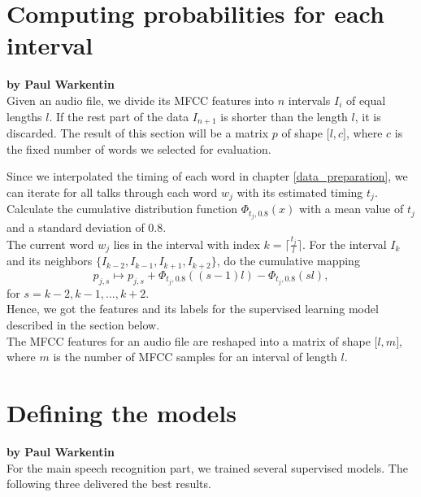 \section{Computing probabilities for each interval}
\label{interval_word_prob}

\textbf{by Paul Warkentin} \\

Given an audio file, we divide its MFCC features into $n$ intervals $I_i$ of equal lengths $l$. If the rest part of the data $I_{n+1}$ is shorter than the length $l$, it is discarded. The result of this section will be a matrix $p$ of shape $\lbrack l, c \rbrack$, where $c$ is the fixed number of words we selected for evaluation.

Since we interpolated the timing of each word in chapter \ref{data_preparation}, we can iterate for all talks through each word $w_j$ with its estimated timing $t_j$. Calculate the cumulative distribution function $\Phi_{t_j, 0.8}(x)$ with a mean value of $t_j$ and a standard deviation of 0.8. \\
The current word $w_j$ lies in the interval with index $k = \lceil \tfrac{t_j}{l} \rceil$. For the interval $I_k$ and its neighbors $\{I_{k-2}, I_{k-1}, I_{k+1}, I_{k+2}\}$, do the cumulative mapping
\[p_{j, s} \mapsto p_{j, s} + \Phi_{t_j, 0.8}((s - 1) l) - \Phi_{t_j, 0.8}(s l),\]
for $s = k-2, k-1, \dots, k+2$. \\

Hence, we got the features and its labels for the supervised learning model described in the section below. \\
The MFCC features for an audio file are reshaped into a matrix of shape $\lbrack l, m \rbrack$, where $m$ is the number of MFCC samples for an interval of length $l$.

\section{Defining the models}

\textbf{by Paul Warkentin} \\


For the main speech recognition part, we trained several supervised models. The following three delivered the best results.

